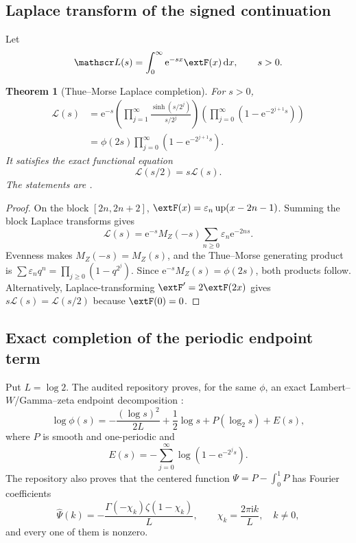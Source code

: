 \documentclass[11pt,oneside]{article}
\newtheorem{theorem}{Theorem}[section]
\theoremstyle{definition}
\theoremstyle{remark}
\newcommand{\Up}{\operatorname{up}}
\newcommand{\dd}{\,\mathrm d}
\newcommand{\e}{\mathrm e}
\newcommand{\ii}{\mathrm i}
\newcommand{\1}{\mathbf 1}
\begin{document}
\subsection{Laplace transform of the signed continuation}

Let
\begin{equation}
 \mathscr L(s)=\int_0^{\infty}\e^{-sx}\extF(x)\dd x,
 \qquad s>0.
 \label{p7:eq:signed-Laplace-def}
\end{equation}

\begin{theorem}[Thue--Morse Laplace completion]
\label{p7:thm:signed-Laplace-product}
For $s>0$,
\begin{align}
 \mathscr L(s)
 &=\e^{-s}\left(\prod_{j=1}^{\infty}\frac{\sinh(s/2^j)}{s/2^j}\right)
   \left(\prod_{j=0}^{\infty}(1-\e^{-2^{j+1}s})\right)
 \label{p7:eq:signed-Laplace-up}\\
 &=\phi(2s)\prod_{j=0}^{\infty}(1-\e^{-2^{j+1}s}).
 \label{p7:eq:signed-Laplace-phi}
\end{align}
It satisfies the exact functional equation
\begin{equation}
 \mathscr L(s/2)=s\mathscr L(s).
 \label{p7:eq:signed-Laplace-functional}
\end{equation}
The statements are \statusproved.
\end{theorem}

\begin{proof}
On the block $[2n,2n+2]$,
$\extF(x)=\varepsilon_n\Up(x-2n-1)$.  Summing the block Laplace transforms gives
\[
 \mathscr L(s)=\e^{-s}M_Z(-s)\sum_{n\ge0}\varepsilon_n\e^{-2ns}.
\]
Evenness makes $M_Z(-s)=M_Z(s)$, and the Thue--Morse generating product is
$\sum\varepsilon_nq^n=\prod_{j\ge0}(1-q^{2^j})$.  Since
$\e^{-s}M_Z(s)=\phi(2s)$, both products follow.  Alternatively, Laplace-transforming
$\extF'=2\extF(2x)$ gives $s\mathscr L(s)=\mathscr L(s/2)$ because $\extF(0)=0$.
\end{proof}

\subsection{Exact completion of the periodic endpoint term}

Put $L=\log2$.  The audited repository proves, for the same $\phi$, an exact Lambert--$W$/Gamma--zeta
endpoint decomposition \cite{p7:project-primary,p7:project-frontier,p7:corless1996}:
\begin{equation}
 \log\phi(s)=-\frac{(\log s)^2}{2L}+\frac12\log s
 +P(\log_2s)+E(s),
 \label{p7:eq:repo-periodic-decomp}
\end{equation}
where $P$ is smooth and one-periodic and
\begin{equation}
 E(s)=-\sum_{j=0}^{\infty}\log(1-\e^{-2^js}).
 \label{p7:eq:E-tail-product}
\end{equation}
The repository also proves that the centered function
$\Psi=P-\int_0^1P$ has Fourier coefficients
\begin{equation}
 \widehat\Psi(k)=
 -\frac{\Gamma(-\chi_k)\zeta(1-\chi_k)}L,
 \qquad
 \chi_k=\frac{2\pi\ii k}{L},\quad k\ne0,
 \label{p7:eq:Gamma-zeta-Psi}
\end{equation}
and every one of them is nonzero.
\end{document}
